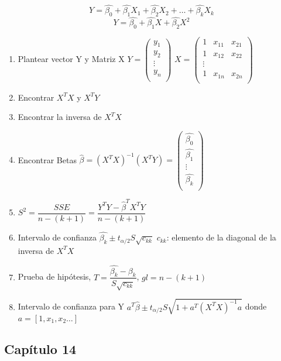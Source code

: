 $$Y=\hat{\beta_0}+\hat{\beta_1}X_1+\hat{\beta_2}X_2+\dots+\hat{\beta_k}X_k$$
$$Y=\hat{\beta_0}+\hat{\beta_1}X+\hat{\beta_2}X^2$$
\begin{enumerate}
	\item Plantear vector Y y Matriz X
	$Y=\begin{pmatrix}
	y_1 \\
	y_2\\
	\vdots\\
	y_n \\
	\end{pmatrix}$
	$X=\begin{pmatrix}
	1 & x_{11} & x_{21}\\
	1 & x_{12} & x_{22}\\
	\vdots\\
	1 & x_{1n} & x_{2n}\\
	\end{pmatrix}$
	\item Encontrar $X^TX$ y $X^TY$
	\item Encontrar la inversa de $X^TX$ 
	\item Encontrar Betas $\hat{\beta}=(X^TX)^{-1}(X^TY)=\begin{pmatrix}
	\hat{\beta_0} \\
	\hat{\beta_1}\\
	\vdots\\
	\hat{\beta_k} \\
	\end{pmatrix}$
	\item $S^2=\dfrac{SSE}{n-(k+1)}=\dfrac{Y^TY-\hat{\beta}^TX^TY}{n-(k+1)}$
	\item Intervalo de confianza $\hat{\beta_k}\pm t_{\alpha/2}S\sqrt{c_{kk}}$ $c_{kk}$: elemento de la diagonal de la inversa de $X^TX$ 
	\item Prueba de hipótesis, $T=\dfrac{\hat{\beta_k}-\beta_k}{S\sqrt{c_{kk}}}$, $gl=n-(k+1)$
	\item Intervalo de confianza para Y $a^T\hat{\beta}\pm t_{\alpha/2}S\sqrt{1+a^T(X^TX)^{-1}a}$ donde $a=[1,x_1,x_2\dots]$
\end{enumerate}

\subsection{Capítulo 14}

